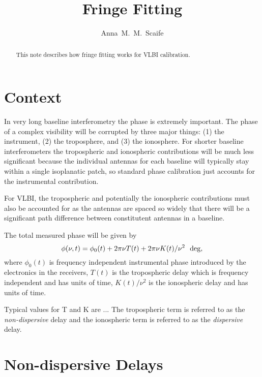 \documentclass{tufte-handout}
\title{Fringe Fitting}
\author[Anna~M.~M.~Scaife]{Anna~M.~M.~Scaife}
\begin{document}
\maketitle%

\begin{abstract}
\noindent
This note describes how fringe fitting works for VLBI calibration.
\end{abstract}


\section{Context}
\label{sec:context}

In very long baseline interferometry the phase is extremely important. The phase of a complex visibility will be corrupted by three major things: (1) the instrument, (2) the troposphere, and (3) the ionosphere. For shorter baseline interferometers the tropospheric and ionospheric contributions will be much less significant because the individual antennas for each baseline will typically stay within a single isoplanatic patch, so standard phase calibration just accounts for the instrumental contribution. 

For VLBI, the tropospheric and potentially the ionospheric contributions must also be accounted for as the antennas are spaced so widely that there will be a significant path difference between constitutent antennas in a baseline.

The total measured phase will be given by
%
\begin{equation}
\label{eq:phase}
\phi(\nu, t) = \phi_0(t) + 2\pi\nu T(t) + 2\pi \nu K(t)/\nu^2~~{\rm deg},
\end{equation}
%
where $\phi_0(t)$ is frequency independent instrumental phase introduced by the electronics in the receivers, $T(t)$ is the tropospheric delay which is frequency independent and has units of time, $K(t)/\nu^2$ is the ionospheric delay and has units of time.

Typical values for T and K are ... The tropospheric term is referred to as the \emph{non-dispersive} delay and the ionospheric term is referred to as the \emph{dispersive} delay.



\section{Non-dispersive Delays}
\label{sec:non-dsipersive}
\end{document}
